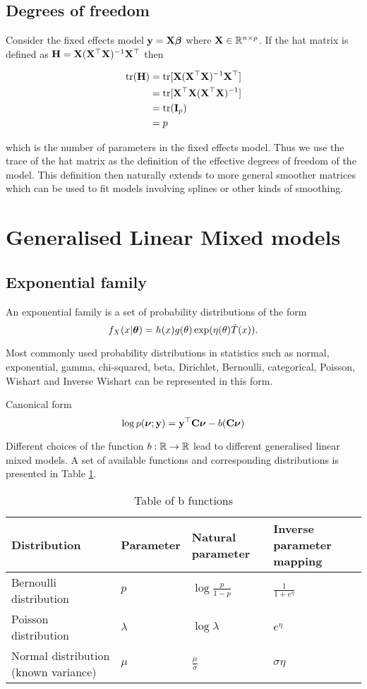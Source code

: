 \documentclass{amsart}[12pt]
\begin{document}
\subsection{Degrees of freedom}


Consider the fixed effects model ${\bf y} = {\bf X} {\boldsymbol \beta}$ where ${\bf X} \in {\mathbb{R}}^{n \times p}$. If the hat matrix is
defined as ${\bf H} = {\bf X} ({\bf X}^\top{\bf X})^{-1} {\bf X}^\top$ then

\begin{align*}
\text{tr}({\bf H}) &= \text{tr}[{\bf X}({\bf X}^\top{\bf X})^{-1}{\bf X}^\top] \\
&= \text{tr}[{\bf X}^\top{\bf X} ({\bf X}^\top{\bf X})^{-1}] \\
&= \text{tr}({\bf I}_p) \\
&= p
\end{align*}

which is the number of parameters in the fixed effects model. Thus we use the trace of the hat matrix as
the definition of the effective degrees of freedom of the model. This definition then naturally extends to
more general smoother matrices which can be used to fit models involving splines or other kinds of smoothing.

\section{Generalised Linear Mixed models}

\subsection{Exponential family}

An exponential family is a set of probability distributions of the form
$$
f_X(x|{\boldsymbol \theta}) = h(x) g(\theta) \exp(\eta(\theta) \dot T(x)).
$$

Most commonly used probability distributions in statistics such as normal, exponential, gamma,
chi-squared, beta, Dirichlet, Bernoulli, categorical, Poisson, Wishart and Inverse Wishart can
be represented in this form.

Canonical form
$$
\log p({\boldsymbol \nu}; {\bf y}) = {\bf y}^\top {\bf C} {\boldsymbol\nu} - b({\bf C} {\boldsymbol \nu})
$$

Different choices of the function $b:{\mathbb{R}} \to {\mathbb{R}}$ lead to different generalised linear mixed models. A set
of available functions and corresponding distributions is presented in Table \ref{tab:b_functions}.

\begin{table}
\caption{Table of b functions}
\label{tab:b_functions}
\begin{tabular}{|l|lll|}
\hline
Distribution & Parameter & Natural parameter & Inverse parameter mapping \\
\hline
Bernoulli distribution & $p$ & $\log{\frac{p}{1 - p}}$ & $\frac{1}{1 + e^\eta}$ \\
Poisson distribution & $\lambda$ & $\log \lambda$ & $e^\eta$ \\
Normal distribution (known variance) & $\mu$ & $\frac{\mu}{\sigma}$ & $\sigma \eta$ \\
\hline
\end{tabular}
\end{table}
\end{document}
